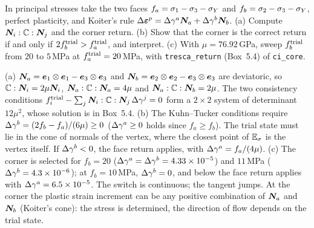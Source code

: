 \label{exo:pn-tresca}
%
In principal stresses take the two faces $f_a=\sigma_1-\sigma_3-\sigma_{Y}$ and
$f_b=\sigma_2-\sigma_3-\sigma_{Y}$, perfect plasticity, and Koiter's rule
$\Delta\bm{\varepsilon}^{p}=\Delta\gamma^a\bm{N}_a+\Delta\gamma^b\bm{N}_b$. (a) Compute
$\bm{N}_i:\mathbb{C}:\bm{N}_j$ and the corner return. (b) Show that the corner is
the correct return if and only if $2f_b^{\mathrm{trial}}>f_a^{\mathrm{trial}}$, and interpret.
(c) With $\mu=76.92$\,GPa, sweep $f_b^{\mathrm{trial}}$ from $20$ to $5$\,MPa at
$f_a^{\mathrm{trial}}=20$\,MPa, with \texttt{tresca\_return} (Box~5.4) of
\texttt{ci\_core}.
\begin{solution}
(a) $\bm{N}_a=\bm{e}_1\otimes\bm{e}_1-\bm{e}_3\otimes\bm{e}_3$ and
$\bm{N}_b=\bm{e}_2\otimes\bm{e}_2-\bm{e}_3\otimes\bm{e}_3$ are deviatoric, so
$\mathbb{C}:\bm{N}_i=2\mu\bm{N}_i$, $\bm{N}_a:\mathbb{C}:\bm{N}_a=4\mu$ and
$\bm{N}_a:\mathbb{C}:\bm{N}_b=2\mu$. The two consistency conditions
$f_i^{\mathrm{trial}}-\sum_j\bm{N}_i:\mathbb{C}:\bm{N}_j\,\Delta\gamma^j=0$ form a $2\times2$ system
of determinant $12\mu^2$, whose solution is in Box~5.4.
(b) The Kuhn--Tucker conditions require $\Delta\gamma^b=(2f_b-f_a)/(6\mu)\ge0$ ($\Delta\gamma^a\ge0$
holds since $f_a\ge f_b$). The trial state must lie in the cone of normals of
the vertex, where the closest point of $\mathbb{E}_{\sigma}$ is the vertex itself. If
$\Delta\gamma^b<0$, the face return applies, with $\Delta\gamma^a=f_a/(4\mu)$.
(c) The corner is selected for $f_b=20$ ($\Delta\gamma^a=\Delta\gamma^b=4.33\times10^{-5}$) and $11$\,MPa
($\Delta\gamma^b=4.3\times10^{-6}$); at $f_b=10$\,MPa, $\Delta\gamma^b=0$, and below the face
return applies with $\Delta\gamma^a=6.5\times10^{-5}$. The switch is continuous; the
tangent jumps. At the corner the plastic strain increment can be any positive
combination of $\bm{N}_a$ and $\bm{N}_b$ (Koiter's cone): the stress is
determined, the direction of flow depends on the trial state.

\end{solution}

